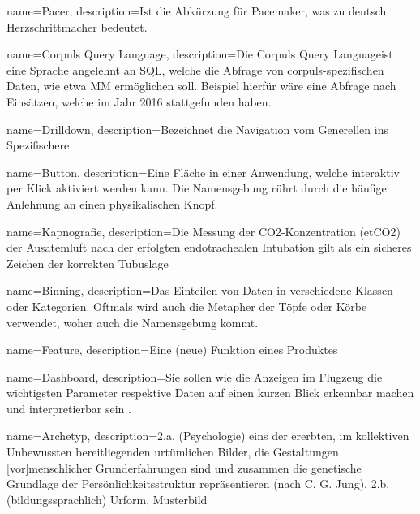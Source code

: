 {
     name=Pacer,
     description={Ist die Abkürzung für \glqq Pacemaker\grqq{}, was zu deutsch Herzschrittmacher bedeutet. }
}



{
     name=Corpuls Query Language,
     description={Die \glqq Corpuls Query Language\grqq ist eine \glqq Sprache\grqq{} angelehnt an SQL, welche die Abfrage von corpuls-spezifischen Daten, wie etwa \gls{MM} ermöglichen soll. Beispiel hierfür wäre eine Abfrage nach Einsätzen, welche im Jahr 2016 stattgefunden haben.}
}

{
     name=Drilldown,
     description={Bezeichnet die Navigation vom Generellen ins Spezifischere \cite{Walter.2008}}
}


{
     name=Button,
     description={Eine Fläche in einer Anwendung, welche interaktiv per Klick aktiviert werden kann. Die Namensgebung rührt durch die häufige Anlehnung an einen physikalischen Knopf.}
}

{
     name=Kapnografie,
     description={\glqq Die Messung der CO2-Konzentration (etCO2)  der Ausatemluft nach der erfolgten endotrachealen Intubation gilt als ein sicheres Zeichen der korrekten Tubuslage \grqq{} \cite{Wnent.2013} }
}

{
     name=Binning,
     description={Das Einteilen von Daten in verschiedene Klassen oder Kategorien. Oftmals wird auch die Metapher der Töpfe oder Körbe verwendet, woher auch die Namensgebung kommt.}
}

{
     name=Feature,
     description={Eine (neue) Funktion eines Produktes}
}

{
     name=Dashboard,
     description={Sie sollen wie die Anzeigen im Flugzeug die wichtigsten Parameter respektive Daten auf einen kurzen Blick erkennbar machen und interpretierbar sein \cite[S.18]{Engels.2015}.}
}


{
     name=Archetyp,
     description={\glqq 2.a. (Psychologie) eins der ererbten, im kollektiven Unbewussten bereitliegenden urtümlichen Bilder, die Gestaltungen [vor]menschlicher Grunderfahrungen sind und zusammen die genetische Grundlage der Persönlichkeitsstruktur repräsentieren (nach C. G. Jung).
     2.b. (bildungssprachlich) Urform, Musterbild\grqq \cite{Dudenredaktion.2015}}
}

